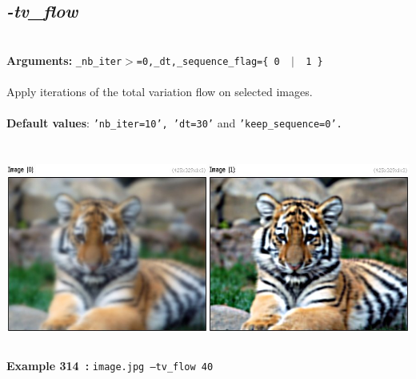 \documentclass[a4paper,11pt,twoside]{book}
\begin{document}
\subsection{\emph{-tv\_flow} }\vspace*{-0.5em}
~\\\textbf{Arguments: } 
{\small \texttt{\_nb\_iter$>$=0,\_dt,\_sequence\_flag=\{ 0 ~$|$~ 1 \}}}\\~\\
Apply iterations of the total variation flow on selected images.
~\\~\\\textbf{Default values}: {\small \texttt{'nb\_iter=10', 'dt=30'} and \texttt{'keep\_sequence=0'.}}
\begin{center}\includegraphics[keepaspectratio=true,height=7cm,width=\textwidth]{img/gmic_def314.jpg}\\
{\footnotesize \textbf{Example 314~:} \texttt{image.jpg --tv\_flow 40}}
\end{center}
\end{document}
